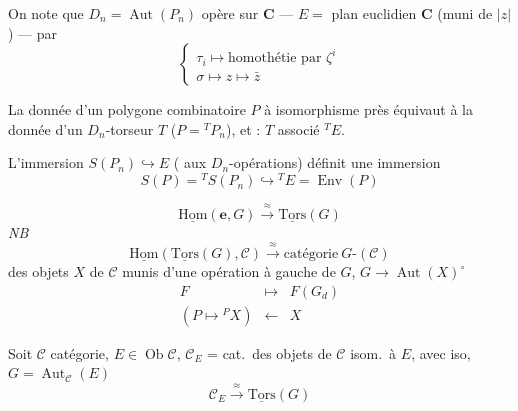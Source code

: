 \documentclass[11pt,a4paper]{article}
\begin{document}
On note que $D_n = \operatorname{Aut}(P_n)$ opère sur $\mathbf{C}$ ---
$E =$ plan euclidien $\mathbf{C}$ (muni de $|z|$) ---
par
\[
  \begin{cases}
    \tau_i \longmapsto \text{homothétie par } \zeta^i \\
    \sigma \longmapsto z \mapsto \bar{z}
  \end{cases}
\]

La donnée d'un polygone combinatoire $P$ à isomorphisme près équivaut à la
donnée d'un $D_n$-torseur $T$ ($P = {}^{T}P_n$), et : $T$ \struck{\ill{}}
associé ${}^{T}E$.

L'immersion $S(P_n) \hookrightarrow E$ ( aux $D_n$-opérations)
définit une immersion
\[
  S(P) = {}^{T}S(P_n) \hookrightarrow {}^{T}E = \operatorname{Env}(P)
\]

\[
  \underline{\mathrm{Hom}}(\mathbf{e}, G) \overset{\approx}{\longrightarrow}
  \underline{\mathrm{Tors}}(G)
\]
\emph{NB}
\[
  \underline{\mathrm{Hom}}(\underline{\mathrm{Tors}}(G), \mathcal{C})
  \overset{\approx}{\longrightarrow} \text{catégorie}\ G\text{-}(\mathcal{C})
\]
des objets $X$ de $\mathcal{C}$ munis d'une opération à gauche de $G$,
$G \to \operatorname{Aut}(X)^{\circ}$
\[
  \begin{array}{rcl}
    F & \longmapsto & F(G_d) \\
    (P \mapsto {}^{P}X) & \longleftarrow & X
  \end{array}
\]

Soit $\mathcal{C}$ catégorie, $E \in \operatorname{Ob} \mathcal{C}$,
$\mathcal{C}_E$ = cat.\ des objets de $\mathcal{C}$ isom.\ à $E$, avec iso,
$G = \operatorname{Aut}_{\mathcal{C}}(E)$
\[
  \mathcal{C}_E \overset{\approx}{\longrightarrow} \underline{\mathrm{Tors}}(G)
\]

\end{document}
